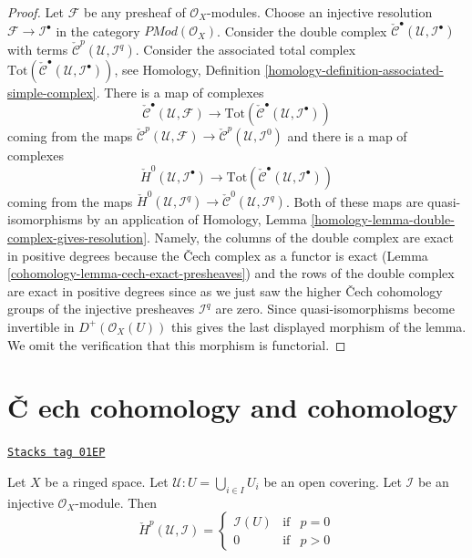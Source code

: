\begin{proof}
\medskip\noindent
Let $\mathcal{F}$ be any presheaf of $\mathcal{O}_X$-modules.
Choose an injective resolution $\mathcal{F} \to \mathcal{I}^\bullet$
in the category $\textit{PMod}(\mathcal{O}_X)$.
Consider the double complex
$\check{\mathcal{C}}^\bullet(\mathcal{U}, \mathcal{I}^\bullet)$ with terms
$\check{\mathcal{C}}^p(\mathcal{U}, \mathcal{I}^q)$.
Consider the associated total complex
$\text{Tot}(\check{\mathcal{C}}^\bullet(\mathcal{U}, \mathcal{I}^\bullet))$,
see Homology, Definition \ref{homology-definition-associated-simple-complex}.
There is a map of complexes
$$
\check{\mathcal{C}}^\bullet(\mathcal{U}, \mathcal{F})
\longrightarrow
\text{Tot}(\check{\mathcal{C}}^\bullet(\mathcal{U}, \mathcal{I}^\bullet))
$$
coming from the maps
$\check{\mathcal{C}}^p(\mathcal{U}, \mathcal{F})
\to \check{\mathcal{C}}^p(\mathcal{U}, \mathcal{I}^0)$
and there is a map of complexes
$$
\check{H}^0(\mathcal{U}, \mathcal{I}^\bullet)
\longrightarrow
\text{Tot}(\check{\mathcal{C}}^\bullet(\mathcal{U}, \mathcal{I}^\bullet))
$$
coming from the maps
$\check{H}^0(\mathcal{U}, \mathcal{I}^q) \to
\check{\mathcal{C}}^0(\mathcal{U}, \mathcal{I}^q)$.
Both of these maps are quasi-isomorphisms by an application of
Homology, Lemma \ref{homology-lemma-double-complex-gives-resolution}.
Namely, the columns of the double complex are exact in positive degrees
because the {\v C}ech complex as a functor is exact
(Lemma \ref{cohomology-lemma-cech-exact-presheaves})
and the rows of the double complex are exact in positive degrees
since as we just saw the higher {\v C}ech cohomology groups of the injective
presheaves $\mathcal{I}^q$ are zero.
Since quasi-isomorphisms become invertible
in $D^{+}(\mathcal{O}_X(U))$ this gives the last displayed morphism
of the lemma. We omit the verification that this morphism is
functorial.
\end{proof}

\section{{\v C}
ech cohomology and cohomology}
\label{cohomology-section-cech-cohomology-cohomology}

\begin{lemma}
\label{cohomology-lemma-injective-trivial-cech}
\href{https://stacks.math.columbia.edu/tag/01EP}{\texttt{Stacks tag 01EP}}

Let $X$ be a ringed space.
Let $\mathcal{U} : U = \bigcup_{i \in I} U_i$ be an open covering.
Let $\mathcal{I}$ be an injective $\mathcal{O}_X$-module.
Then
$$
\check{H}^p(\mathcal{U}, \mathcal{I}) =
\left\{
\begin{matrix}
\mathcal{I}(U) & \text{if} & p = 0 \\
0 & \text{if} & p > 0
\end{matrix}
\right.
$$
\end{lemma}


